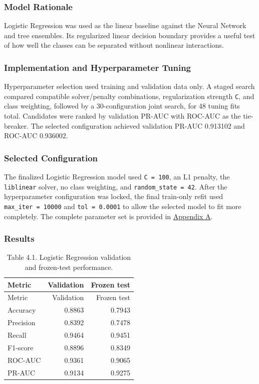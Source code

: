 \documentclass[
  canadian,
  12pt,
]{article}
\let\reportOrigSubsubsection\subsubsection
\renewcommand{\subsubsection}{\par\Needspace*{5\baselineskip}\reportOrigSubsubsection}%
\begin{document}
\subsubsection{Model Rationale}\label{model-rationale}

Logistic Regression was used as the linear baseline against the Neural
Network and tree ensembles. Its regularized linear decision boundary
provides a useful test of how well the classes can be separated without
nonlinear interactions.

\subsubsection{Implementation and Hyperparameter
Tuning}\label{implementation-and-hyperparameter-tuning}

Hyperparameter selection used training and validation data only. A
staged search compared compatible solver/penalty combinations,
regularization strength \texttt{C}, and class weighting, followed by a
30-configuration joint search, for 48 tuning fits total. Candidates were
ranked by validation PR-AUC with ROC-AUC as the tie-breaker. The
selected configuration achieved validation PR-AUC 0.913102 and ROC-AUC
0.936002.

\subsubsection{Selected Configuration}\label{selected-configuration}

The finalized Logistic Regression model used \texttt{C\ =\ 100}, an L1
penalty, the \texttt{liblinear} solver, no class weighting, and
\texttt{random\_state\ =\ 42}. After the hyperparameter configuration
was locked, the final train-only refit used \texttt{max\_iter\ =\ 10000}
and \texttt{tol\ =\ 0.0001} to allow the selected model to fit more
completely. The complete parameter set is provided in
\hyperref[sec-app-a]{Appendix A}.

\subsubsection{Results}\label{sec-4-1-results}

\begin{longtable}[]{@{}lrr@{}}
\caption{Table 4.1. Logistic Regression validation and frozen-test
performance.}\tabularnewline
\toprule\noalign{}
Metric & Validation & Frozen test \\
\midrule\noalign{}
\endfirsthead
\toprule\noalign{}
Metric & Validation & Frozen test \\
\midrule\noalign{}
\endhead
\bottomrule\noalign{}
\endlastfoot
Accuracy & 0.8863 & 0.7943 \\
Precision & 0.8392 & 0.7478 \\
Recall & 0.9464 & 0.9451 \\
F1-score & 0.8896 & 0.8349 \\
ROC-AUC & 0.9361 & 0.9065 \\
PR-AUC & 0.9134 & 0.9275 \\
\end{longtable}
\end{document}

